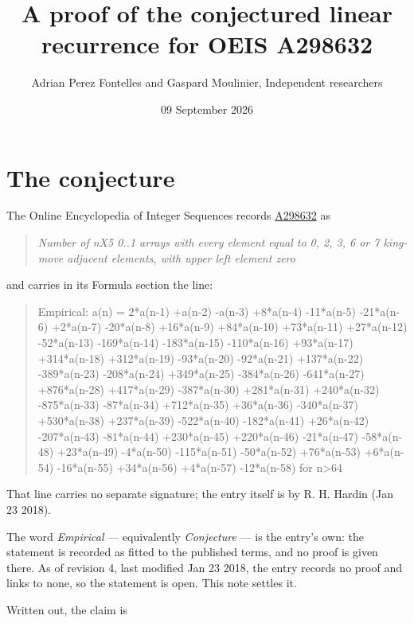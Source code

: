 \documentclass[11pt]{article}
\title{A proof of the conjectured linear recurrence for OEIS A298632}
\author{Adrian Perez Fontelles and Gaspard Moulinier, Independent researchers}
\date{09 September 2026}
\theoremstyle{definition}
\begin{document}
\maketitle
\section{The conjecture}

The Online Encyclopedia of Integer Sequences records \href{https://oeis.org/A298632}{A298632} as

\begin{quote}\itshape Number of nX5 0..1 arrays with every element equal to 0, 2, 3, 6 or 7 king-move adjacent elements, with upper left element zero\end{quote}

and carries in its Formula section the line:

\begin{quote}\ttfamily Empirical: a(n) = 2*a(n-1) +a(n-2) -a(n-3) +8*a(n-4) -11*a(n-5) -21*a(n-6) +2*a(n-7) -20*a(n-8) +16*a(n-9) +84*a(n-10) +73*a(n-11) +27*a(n-12) -52*a(n-13) -169*a(n-14) -183*a(n-15) -110*a(n-16) +93*a(n-17) +314*a(n-18) +312*a(n-19) -93*a(n-20) -92*a(n-21) +137*a(n-22) -389*a(n-23) -208*a(n-24) +349*a(n-25) -384*a(n-26) -641*a(n-27) +876*a(n-28) +417*a(n-29) -387*a(n-30) +281*a(n-31) +240*a(n-32) -875*a(n-33) -87*a(n-34) +712*a(n-35) +36*a(n-36) -340*a(n-37) +530*a(n-38) +237*a(n-39) -522*a(n-40) -182*a(n-41) +26*a(n-42) -207*a(n-43) -81*a(n-44) +230*a(n-45) +220*a(n-46) -21*a(n-47) -58*a(n-48) +23*a(n-49) -4*a(n-50) -115*a(n-51) -50*a(n-52) +76*a(n-53) +6*a(n-54) -16*a(n-55) +34*a(n-56) +4*a(n-57) -12*a(n-58) for n>64\end{quote}

That line carries no separate signature; the entry itself is by R. H. Hardin (Jan 23 2018).

The word {\itshape Empirical} --- equivalently {\itshape Conjecture} --- is the entry's own: the statement is recorded as fitted to the published terms, and no proof is given there. As of revision 4, last modified Jan 23 2018, the entry records no proof and links to none, so the statement is open. This note settles it.

Written out, the claim is
\end{document}
